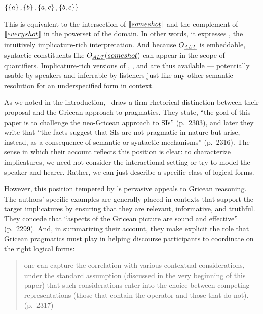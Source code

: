\documentclass{article}
\begin{document}
%
\begin{examples}
\item\label{altsomeshotex}
  $\left\{ \left\{ a \right\}, \left\{ b \right\}, \left\{ a,c \right\}, \left\{ b,c \right\} \right\}$
\end{examples}
%
This is equivalent to the intersection of $\llbracket\emph{some shot}\rrbracket$ and
the complement of $\llbracket\emph{every shot}\rrbracket$ in the powerset of the
domain.  In other words, it expresses , the
intuitively implicature-rich interpretation. And because $O_{\emph{ALT}}$ is
embeddable, syntactic constituents like $O_{\emph{ALT}}(\emph{some shot})$
can appear in the scope of quantifiers.  Implicature-rich versions of
, , and  are thus available
--- potentially usable by speakers and inferrable by listeners just
like any other semantic resolution for an underspecified form in
context.

As we noted in the introduction, \CFS\ draw a firm rhetorical
distinction between their proposal and the Gricean approach to
pragmatics. They state, ``the goal of this paper is to challenge the
neo-Gricean approach to SIs'' (p.~2303), and later they write that
``the facts suggest that SIs are not pragmatic in nature but arise,
instead, as a consequence of semantic or syntactic mechanisms''
(p.~2316). The sense in which their account reflects this position is
clear: to characterize implicatures, we need not consider the
interactional setting or try to model the speaker and hearer. Rather,
we can just describe a specific class of logical forms.

However, this position tempered by \CFS's pervasive appeals to Gricean
reasoning.  The authors' specific examples are generally placed in
contexts that support the target implicatures by ensuring that they
are relevant, informative, and truthful.  They concede that ``aspects
of the Gricean picture are sound and effective'' (p.~2299). And, in
summarizing their account, they make explicit the role that Gricean
pragmatics must play in helping discourse participants to coordinate
on the right logical forms:
%
\begin{quote}
  one can capture the correlation with various contextual
  considerations, under the standard assumption (discussed in the very
  beginning of this paper) that such considerations enter into the
  choice between competing representations (those that contain the
  operator and those that do not). (p.~2317)
\end{quote}
\end{document}
